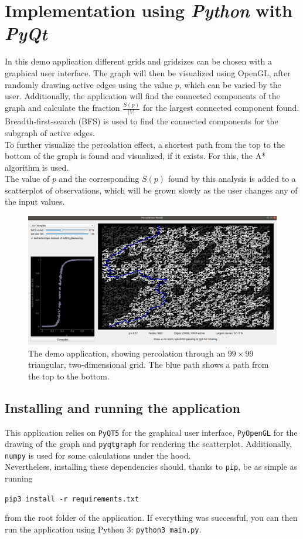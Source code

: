 \documentclass[a4paper,fleqn]{article}
\begin{document}
\section*{Implementation using \emph{Python} with \emph{PyQt}}
In this demo application different grids and gridsizes can be chosen with a graphical 
user interface. The graph will then be visualized using OpenGL, after randomly drawing active edges using the value $p$, which can be varied by the user.
Additionally, the application will find the connected components of the graph and calculate the fraction $\frac{S(p)}{|V|}$ for the largest connected component found. Breadth-first-search (BFS) is used to find the connected components for the subgraph of active edges.\\
To further visualize the percolation effect, a shortest path from the top to the bottom of the graph is found and visualized, if it exists. For this, the A* algorithm is used.\\
The value of $p$ and the corresponding $S(p)$ found by this analysis is added to a scatterplot of observations, which will be grown slowly as the user changes any of the input values.
\begin{figure}[H]
	\includegraphics*[width=\textwidth]{images/screen1}
	\caption{The demo application, showing percolation through an $99 \times 99$ triangular, two-dimensional grid. The blue path shows a path from the top to the bottom.}	\label{screenshot}
\end{figure}
\subsection*{Installing and running the application}
This application relies on \verb|PyQT5| for the graphical user interface, \verb|PyOpenGL| for the drawing of the graph and \verb|pyqtgraph| for rendering the scatterplot. Additionally, \verb|numpy| is used for some calculations under the hood.\\
Nevertheless, installing these dependencies should, thanks to \verb|pip|, be as simple as running
\begin{center}
	\verb|pip3 install -r requirements.txt|
\end{center}
from the root folder of the application. If everything was successful, you can then run the application using Python 3: \verb|python3 main.py|.
\end{document}
